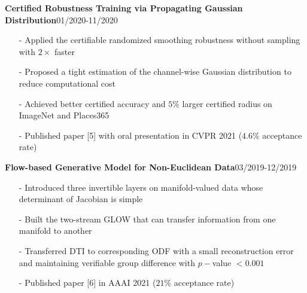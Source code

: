 \documentclass[margin]{res}
\begin{document}
\begin{resume}
                 \vspace{-1em} 
                \textbf{Certified Robustness Training via Propagating Gaussian Distribution}\hfill 01/2020-11/2020
                \begin{itemize}\itemsep -2.2pt %
                 \item[-] Applied the certifiable randomized smoothing robustness without sampling with $2\times$ faster
                 \item[-] Proposed a tight estimation of the channel-wise Gaussian distribution to reduce computational cost
                 \item[-] Achieved better certified accuracy and $5\%$ larger certified radius on ImageNet and Places365
                 \item[-] Published paper [5] with oral presentation in CVPR 2021 ($4.6\%$ acceptance rate)
                 \end{itemize}

                 \vspace{-1em}  

                \textbf{Flow-based Generative Model for Non-Euclidean Data}\hfill 03/2019-12/2019
                \begin{itemize}\itemsep -2.2pt %
                 \item[-] Introduced three invertible layers on manifold-valued data whose determinant of Jacobian is simple
                 \item[-] Built the two-stream GLOW that can transfer information from one manifold to another
                 \item[-] Transferred DTI to corresponding ODF with a small reconstruction error and maintaining verifiable group difference with $p-$value $<0.001$
				\item[-] Published paper [6] in AAAI 2021 ($21\%$ acceptance rate)
                 \end{itemize}

                 \vspace{-1em}  


\end{resume}
\end{document}
